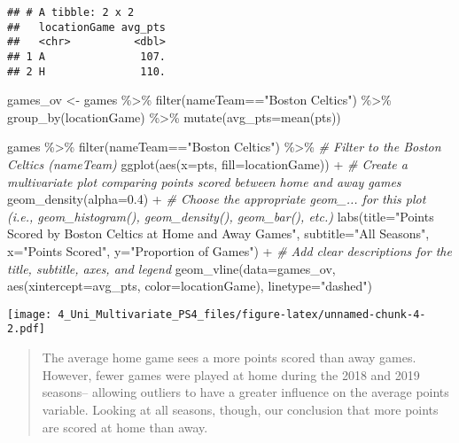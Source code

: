 \documentclass[
]{article}
\newenvironment{Shaded}{\begin{snugshade}}{\end{snugshade}}
\newcommand{\AttributeTok}[1]{\textcolor[rgb]{0.77,0.63,0.00}{#1}}
\newcommand{\CommentTok}[1]{\textcolor[rgb]{0.56,0.35,0.01}{\textit{#1}}}
\newcommand{\FloatTok}[1]{\textcolor[rgb]{0.00,0.00,0.81}{#1}}
\newcommand{\FunctionTok}[1]{\textcolor[rgb]{0.00,0.00,0.00}{#1}}
\newcommand{\NormalTok}[1]{#1}
\newcommand{\OtherTok}[1]{\textcolor[rgb]{0.56,0.35,0.01}{#1}}
\newcommand{\SpecialCharTok}[1]{\textcolor[rgb]{0.00,0.00,0.00}{#1}}
\newcommand{\StringTok}[1]{\textcolor[rgb]{0.31,0.60,0.02}{#1}}
\begin{document}
\begin{verbatim}
## # A tibble: 2 x 2
##   locationGame avg_pts
##   <chr>          <dbl>
## 1 A               107.
## 2 H               110.
\end{verbatim}

\begin{Shaded}
\begin{Highlighting}[]
\NormalTok{games\_ov }\OtherTok{\textless{}{-}}\NormalTok{ games }\SpecialCharTok{\%\textgreater{}\%}
  \FunctionTok{filter}\NormalTok{(nameTeam}\SpecialCharTok{==}\StringTok{"Boston Celtics"}\NormalTok{) }\SpecialCharTok{\%\textgreater{}\%}
  \FunctionTok{group\_by}\NormalTok{(locationGame) }\SpecialCharTok{\%\textgreater{}\%}
  \FunctionTok{mutate}\NormalTok{(}\AttributeTok{avg\_pts=}\FunctionTok{mean}\NormalTok{(pts))}

\NormalTok{games }\SpecialCharTok{\%\textgreater{}\%}
  \FunctionTok{filter}\NormalTok{(nameTeam}\SpecialCharTok{==}\StringTok{"Boston Celtics"}\NormalTok{) }\SpecialCharTok{\%\textgreater{}\%} \CommentTok{\# Filter to the Boston Celtics (nameTeam)}
  \FunctionTok{ggplot}\NormalTok{(}\FunctionTok{aes}\NormalTok{(}\AttributeTok{x=}\NormalTok{pts, }\AttributeTok{fill=}\NormalTok{locationGame)) }\SpecialCharTok{+} \CommentTok{\# Create a multivariate plot comparing points scored between home and away games}
  \FunctionTok{geom\_density}\NormalTok{(}\AttributeTok{alpha=}\FloatTok{0.4}\NormalTok{) }\SpecialCharTok{+} \CommentTok{\# Choose the appropriate geom\_... for this plot (i.e., geom\_histogram(), geom\_density(), geom\_bar(), etc.)}
  \FunctionTok{labs}\NormalTok{(}\AttributeTok{title=}\StringTok{"Points Scored by Boston Celtics at Home and Away Games"}\NormalTok{,}
       \AttributeTok{subtitle=}\StringTok{"All Seasons"}\NormalTok{,}
       \AttributeTok{x=}\StringTok{"Points Scored"}\NormalTok{,}
       \AttributeTok{y=}\StringTok{"Proportion of Games"}\NormalTok{) }\SpecialCharTok{+} \CommentTok{\# Add clear descriptions for the title, subtitle, axes, and legend}
  \FunctionTok{geom\_vline}\NormalTok{(}\AttributeTok{data=}\NormalTok{games\_ov, }\FunctionTok{aes}\NormalTok{(}\AttributeTok{xintercept=}\NormalTok{avg\_pts, }\AttributeTok{color=}\NormalTok{locationGame), }\AttributeTok{linetype=}\StringTok{"dashed"}\NormalTok{) }
\end{Highlighting}
\end{Shaded}

\texttt{[image: 4\_Uni\_Multivariate\_PS4\_files/figure-latex/unnamed-chunk-4-2.pdf]}

\begin{quote}
The average home game sees a more points scored than away games.
However, fewer games were played at home during the 2018 and 2019
seasons-- allowing outliers to have a greater influence on the average
points variable. Looking at all seasons, though, our conclusion that
more points are scored at home than away.
\end{quote}
\end{document}
